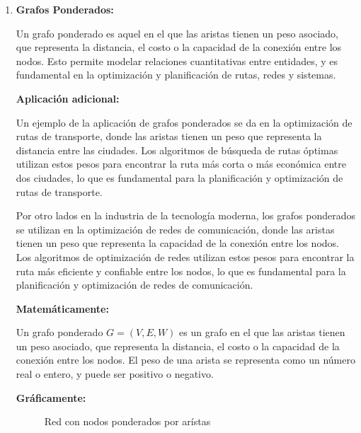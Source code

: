 \documentclass[11pt, a4paper]{article}
\begin{document}
\begin{enumerate}
\newpage

\item \textbf{Grafos Ponderados:}

Un grafo ponderado es aquel en el que las aristas tienen un peso asociado, que representa la distancia, el costo o la capacidad de la conexión entre los nodos. Esto permite modelar relaciones cuantitativas entre entidades, y es fundamental en la optimización y planificación de rutas, redes y sistemas.

\textbf{Aplicación adicional:}

Un ejemplo de la aplicación de grafos ponderados se da en la optimización de rutas de transporte, donde las aristas tienen un peso que representa la distancia entre las ciudades. Los algoritmos de búsqueda de rutas óptimas utilizan estos pesos para encontrar la ruta más corta o más económica entre dos ciudades, lo que es fundamental para la planificación y optimización de rutas de transporte.

Por otro lados en la industria de la tecnología moderna, los grafos ponderados se utilizan en la optimización de redes de comunicación, donde las aristas tienen un peso que representa la capacidad de la conexión entre los nodos. Los algoritmos de optimización de redes utilizan estos pesos para encontrar la ruta más eficiente y confiable entre los nodos, lo que es fundamental para la planificación y optimización de redes de comunicación.

\textbf{Matemáticamente:}

Un grafo ponderado $G = (V, E, W)$ es un grafo en el que las aristas tienen un peso asociado, que representa la distancia, el costo o la capacidad de la conexión entre los nodos. El peso de una arista se representa como un número real o entero, y puede ser positivo o negativo.

\textbf{Gráficamente:}

\begin{figure}[H]
  \centering
  \caption{Red con nodos ponderados por arístas}
  \label{fig:red-ponderada}
\end{figure}


\end{enumerate}
\end{document}
